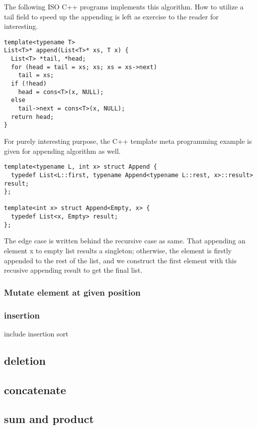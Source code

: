 \documentclass{article}
\begin{document}
The following ISO C++ programs implements this algorithm. How to utilize a tail field to speed up the appending
is left as exercise to the reader for interesting.

\lstset{language=C++}
\begin{lstlisting}
template<typename T>
List<T>* append(List<T>* xs, T x) {
  List<T> *tail, *head;
  for (head = tail = xs; xs; xs = xs->next)
    tail = xs;
  if (!head)
    head = cons<T>(x, NULL);
  else
    tail->next = cons<T>(x, NULL);
  return head;
}
\end{lstlisting}

For purely interesting purpose, the C++ template meta programming example is given for appending algorithm
as well.

\begin{lstlisting}
template<typename L, int x> struct Append {
  typedef List<L::first, typename Append<typename L::rest, x>::result> result;
};

template<int x> struct Append<Empty, x> {
  typedef List<x, Empty> result;
};
\end{lstlisting}

The edge case is written behind the recursive case as same. That appending an element x to empty list
results a singleton; otherwise, the element is firstly appended to the rest of the list, and we
construct the first element with this recusive appending result to get the final list.

\subsubsection{Mutate element at given position}

\subsubsection{insertion}

include insertion sort

\subsection{deletion}

\subsection{concatenate}

\subsection{sum and product}
\end{document}
